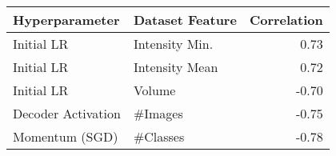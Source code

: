 \begin{tabular}{llr}
\toprule
Hyperparameter & Dataset Feature & Correlation \\
\midrule
Initial LR & Intensity Min. & 0.73 \\
Initial LR & Intensity Mean & 0.72 \\
Initial LR & Volume & -0.70 \\
Decoder Activation & #Images & -0.75 \\
Momentum (SGD) & #Classes & -0.78 \\
\bottomrule
\end{tabular}
